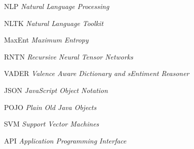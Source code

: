 \begin{siglas}
\item[NLP]{\textit{Natural Language Processing}}
\item[NLTK]{\textit{Natural Language Toolkit}}
\item[MaxEnt]{\textit{Maximum Entropy}}
\item[RNTN]{\textit{Recursive Neural Tensor Networks}}
\item[VADER]{\textit{Valence Aware Dictionary and sEntiment Reasoner}}
\item[JSON]{\textit{JavaScript Object Notation}}
\item[POJO]{\textit{Plain Old Java Objects}}
\item[SVM]{\textit{Support Vector Machines}}
\item[API]{\textit{Application Programming Interface}}
\end{siglas}